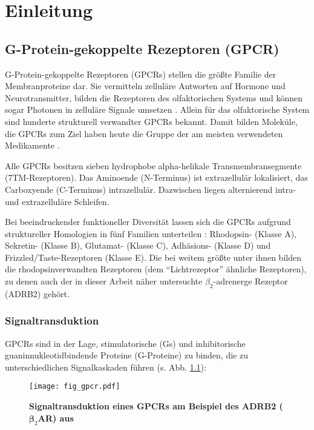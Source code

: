 \chapter{Einleitung}\label{chapter:einleitung}

\section{G-Protein-gekoppelte Rezeptoren (GPCR)}
\label{generalGPCR}
G-Protein-gekoppelte Rezeptoren (GPCRs) stellen die größte Familie der Membranproteine dar. Sie vermitteln zelluläre Antworten auf Hormone und Neurotransmitter, bilden die Rezeptoren des olfaktorischen Systems und können sogar Photonen in zelluläre Signale umsetzen \parencite{Rosenbaum2009}. Allein für das olfaktorische System sind hunderte strukturell verwandter GPCRs bekannt. Damit bilden Moleküle, die GPCRs zum Ziel haben heute die Gruppe der am meisten verwendeten Medikamente \parencite{Pierce2002}.

Alle GPCRs besitzen sieben hydrophobe alpha-helikale Transmembransegmente (7TM-Rezeptoren). Das Aminoende (N-Terminus) ist extrazellulär lokalisiert, das Carboxyende (C-Terminus) intrazellulär. Dazwischen liegen alternierend intra- und extrazelluläre Schleifen. 

Bei beeindruckender funktioneller Diversität lassen sich die GPCRs aufgrund struktureller Homologien in fünf Familien unterteilen \parencite{Fredriksson2003}: Rhodopsin- (Klasse A), Sekretin- (Klasse B), Glutamat- (Klasse C), Adhäsions- (Klasse D) und Frizzled/Taste-Rezeptoren (Klasse E).
Die bei weitem größte unter ihnen bilden die rhodopsinverwandten Rezeptoren (dem "`Lichtrezeptor"' ähnliche Rezeptoren), zu denen auch der in dieser Arbeit näher untersuchte $\beta_2$-adrenerge Rezeptor (ADRB2) gehört.
\subsection{Signaltransduktion}

GPCRs sind in der Lage, stimulatorische (Gs) und inhibitorische guaninnukleotidbindende Proteine (G-Proteine) zu binden, die zu unterschiedlichen Signalkaskaden führen (s. Abb. \ref{fig:gpcr}): 

\begin{figure}[htbp]
	\centering
    \texttt{[image: fig\_gpcr.pdf]}
    \caption{\textbf{Signaltransduktion eines GPCRs am Beispiel des ADRB2 ($\boldsymbol\beta_2$AR) aus \cite{Rosenbaum2009}}} 
    \label{fig:gpcr}
\end{figure}

